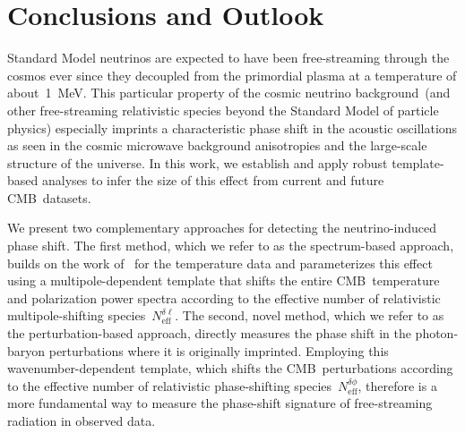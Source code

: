 \documentclass[11pt]{article}
\numberwithin{equation}{section}
\newcommand{\Nphase}{N_\mathrm{eff}^{\delta\phi}}
\newcommand{\Nmultipole}{N_\mathrm{eff}^{\delta\ell}}
\begin{document}
\section{Conclusions and Outlook}
\label{sec:conclusions}

Standard Model neutrinos are expected to have been free-streaming through the cosmos ever since they decoupled from the primordial plasma at a temperature of about~\SI{1}{\mega\electronvolt}. This particular property of the cosmic neutrino background~(and other free-streaming relativistic species beyond the Standard Model of particle physics) especially imprints a characteristic phase shift in the acoustic oscillations as seen in the cosmic microwave background anisotropies and the large-scale structure of the universe. In this work, we establish and apply robust template-based analyses to infer the size of this effect from current and future CMB~datasets.\medskip

We present two complementary approaches for detecting the neutrino-induced phase shift. The first method, which we refer to as the spectrum-based approach, builds on the work of~\cite{Follin:2015hya} for the temperature data and parameterizes this effect using a multipole-dependent template that shifts the entire CMB~temperature and polarization power spectra according to the effective number of relativistic multipole-shifting species~$\Nmultipole$. The second, novel method, which we refer to as the perturbation-based approach, directly measures the phase shift in the photon-baryon perturbations where it is originally imprinted. Employing this wavenumber-dependent template, which shifts the CMB~perturbations according to the effective number of relativistic phase-shifting species~$\Nphase$, therefore is a more fundamental way to measure the phase-shift signature of free-streaming radiation in observed data.
\end{document}
